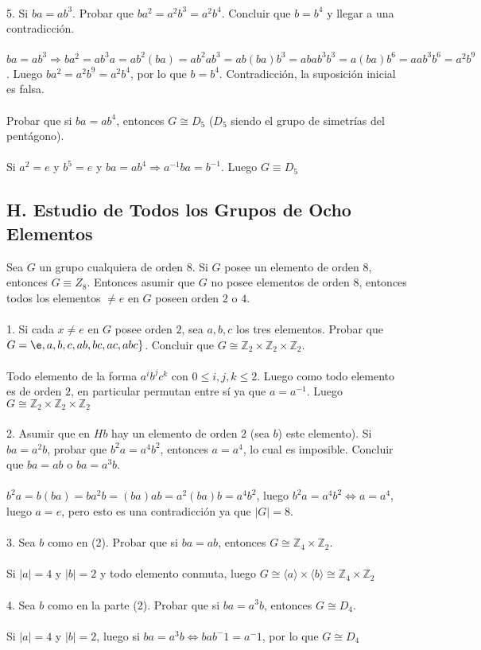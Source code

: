 \documentclass{article}
\newcommand{\Z}{\mathbb{Z}}
\begin{document}
\\
5. Si $ba=ab^{3}$. Probar que $ba^{2}=a^{2}b^{3}=a^{2}b^{4}$. Concluir que $b=b^4$ y llegar a una contradicción.
\\
\\
$ba=ab^{3} \Longrightarrow ba^{2}=ab^{3}a=ab^{2}(ba)=ab^{2}ab^{3}=ab(ba)b^{3}=abab^{3}b^{3}=a(ba)b^{6}=aab^{3}b^{6}=a^{2}b^{9}$. Luego $ba^{2}=a^{2}b^{9}=a^{2}b^{4}$, por lo que $b=b^{4}$. Contradicción, la suposición inicial es falsa.
\\
\\
Probar que si $ba=ab^{4}$, entonces $G \cong D_{5}$ ($D_5$ siendo el grupo de simetrías del pentágono).
\\
\\
Si $a^{2}=e$ y $b^{5}=e$ y $ba=ab^{4} \Longrightarrow a^{-1}ba=b^{-1}$. Luego $G \equiv D_5$
\subsection{H. Estudio de Todos los Grupos de Ocho Elementos}
Sea $G$ un grupo cualquiera de orden $8$. Si $G$ posee un elemento de orden $8$, entonces $G \equiv Z_{8}$. Entonces asumir que $G$ no posee elementos de orden $8$, entonces todos los elementos $\neq e$ en $G$ poseen orden $2$ o $4$.
\\
\\
1. Si cada $x \neq e$ en $G$ posee orden $2$, sea $a,b,c$ los tres elementos. Probar que $G=\e,a,b,c,ab,bc,ac,abc \}$. Concluir que $G \cong \Z_2 \times \Z_2 \times \Z_2$.
\\
\\
Todo elemento de la forma $a^{i}b^{j}c^{k}$ con $0 \leq i,j,k \leq 2$. Luego como todo elemento es de orden $2$, en particular permutan entre sí ya que $a=a^{-1}$. Luego $G \cong \Z_2 \times \Z_2 \times \Z_2$
\\
\\
2. Asumir que en $Hb$ hay un elemento de orden $2$ (sea $b$) este elemento). Si $ba=a^{2}b$, probar que $b^{2}a=a^{4}b^{2}$, entonces $a=a^{4}$, lo cual es imposible. Concluir que $ba=ab$ o $ba=a^3b$.
\\
\\
$b^2a=b(ba)=ba^2b=(ba)ab=a^{2}(ba)b=a^4b^2$, luego $b^2a=a^4b^2 \Longleftrightarrow a=a^4$, luego $a=e$, pero esto es una contradicción ya que $|G|=8$.
\\
\\
3. Sea $b$ como en (2). Probar que si $ba=ab$, entonces $G \cong \Z_4 \times \Z_2$.
\\
\\
Si $|a|=4$ y $|b|=2$ y todo elemento conmuta, luego $G \cong \langle a \rangle \times \langle b \rangle \cong \Z_4 \times \Z_2$
\\
\\
4. Sea $b$ como en la parte (2). Probar que si $ba=a^3b$, entonces $G \cong D_4$.
\\
\\
Si $|a|=4$ y $|b|=2$, luego si $ba=a^3b \Longleftrightarrow bab^-1=a^-1$, por lo que $G \cong D_4$
\end{document}

